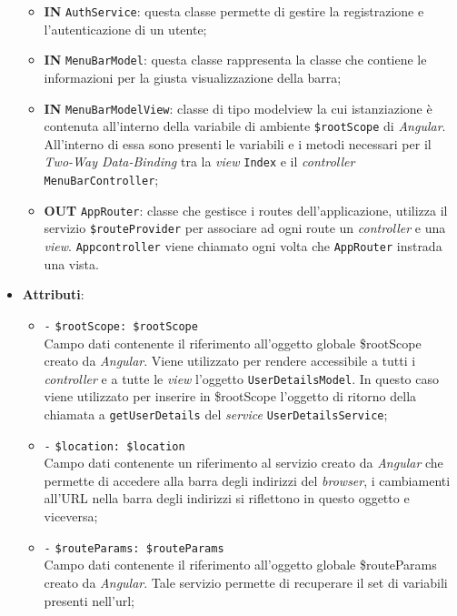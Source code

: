 \begin{itemize}
\begin{itemize}
		\item \textbf{IN} \texttt{AuthService}: questa classe permette di gestire la registrazione e l'autenticazione di un utente;
		\item \textbf{IN} \texttt{MenuBarModel}: questa classe rappresenta la classe che contiene le informazioni per la giusta visualizzazione della barra;
		\item \textbf{IN} \texttt{MenuBarModelView}: classe di tipo modelview la cui istanziazione è contenuta all'interno della variabile di ambiente \texttt{\$rootScope} di \textit{Angular}. All'interno di essa sono presenti le variabili e i metodi necessari per il \textit{Two-Way Data-Binding} tra la \textit{view} \texttt{Index} e il \textit{controller} \texttt{MenuBarController};
		\item \textbf{OUT} \texttt{AppRouter}: classe che gestisce i routes dell’applicazione, utilizza il servizio \texttt{\$routeProvider} per associare ad ogni route un \textit{controller} e una \textit{view}. \texttt{Appcontroller} viene chiamato ogni volta che \texttt{AppRouter} instrada una vista.
	\end{itemize}
	\item \textbf{Attributi}:
	\begin{itemize}
		\item \texttt{-} \texttt{\$rootScope: \$rootScope} \\
		Campo dati contenente il riferimento all'oggetto globale \$rootScope creato da \textit{Angular}. Viene utilizzato per rendere accessibile a tutti i \textit{controller} e a tutte le \textit{view} l'oggetto \texttt{UserDetailsModel}. In questo caso viene utilizzato per inserire in \$rootScope l'oggetto di ritorno della chiamata a \texttt{getUserDetails} del \textit{service} \texttt{UserDetailsService};
		\item \texttt{-} \texttt{\$location: \$location} \\
		Campo dati contenente un riferimento al servizio creato da \textit{Angular} che permette di accedere alla barra degli indirizzi del \textit{browser}, i cambiamenti all'URL nella barra degli indirizzi si riflettono in questo oggetto e viceversa; 
		\item \texttt{-} \texttt{\$routeParams: \$routeParams} \\
		Campo dati contenente il riferimento all'oggetto globale \$routeParams creato da \textit{Angular}. Tale servizio permette di recuperare il set di variabili presenti nell'url;

\end{itemize}
\end{itemize}
